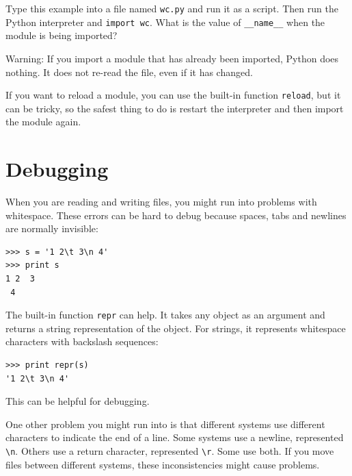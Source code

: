 \documentclass[10pt]{book}
\begin{document}
\begin{CJK}{UTF8}{gbsn}
\begin{exercise}

Type this example into a file named {\tt wc.py} and run
it as a script.  Then run the Python interpreter and
{\tt import wc}.  What is the value of \verb"__name__"
when the module is being imported?

Warning: If you import a module that has already been imported,
Python does nothing.  It does not re-read the file, even if it has
changed.

If you want to reload a module, you can use the built-in function 
{\tt reload}, but it can be tricky, so the safest thing to do is
restart the interpreter and then import the module again.

\end{exercise}



\section{Debugging}

When you are reading and writing files, you might run into problems
with whitespace.  These errors can be hard to debug because spaces,
tabs and newlines are normally invisible:

\begin{verbatim}
>>> s = '1 2\t 3\n 4'
>>> print s
1 2	 3
 4
\end{verbatim}

The built-in function {\tt repr} can help.  It takes any object as an
argument and returns a string representation of the object.  For
strings, it represents whitespace
characters with backslash sequences:

\begin{verbatim}
>>> print repr(s)
'1 2\t 3\n 4'
\end{verbatim}

This can be helpful for debugging.

One other problem you might run into is that different systems
use different characters to indicate the end of a line.  Some
systems use a newline, represented \verb"\n".  Others use
a return character, represented \verb"\r".  Some use both.
If you move files between different systems, these inconsistencies
might cause problems.


\end{CJK}
\end{document}
